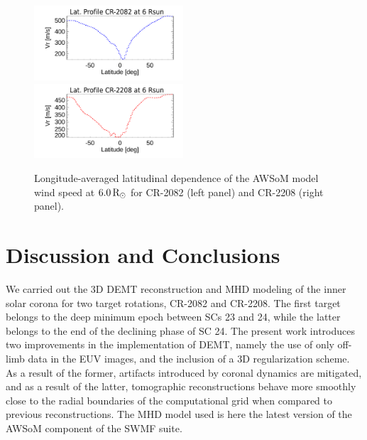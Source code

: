 \documentclass[namedreferences]{solarphysics}
\newcommand{\mrsun}{{\rm R_\odot}}
\def\notebyalbert#1{\textcolor{blue}{NOTE: #1}}
\begin{document}
\begin{article}
\begin{figure}[h!]
\begin{center}
\includegraphics[width=0.495\textwidth]{figs/Perfil_Vr_2082_5995_2.pdf}
\includegraphics[width=0.495\textwidth]{figs/Perfil_Vr_2208_5995_2.pdf}
\caption{{Longitude-averaged latitudinal dependence of the AWSoM model wind speed at $6.0\,\mrsun$ for CR-2082 (left panel) and CR-2208 (right panel).} %
}
\label{perf_lon_vr}
\end{center}
\end{figure}

\section{{Discussion and Conclusions}}\label{discu} 

{We carried out the 3D DEMT reconstruction and MHD modeling of the inner solar corona for two target rotations, CR-2082 and CR-2208. The first target belongs to the deep minimum epoch between SCs 23 and 24, while the latter belongs to the end of the declining phase of SC 24. The present work introduces two improvements in the implementation of DEMT, namely the use of only off-limb data in the EUV images, and the inclusion of a 3D regularization scheme. As a result of the former, artifacts introduced by coronal dynamics are mitigated, and as a result of the latter, tomographic reconstructions behave more smoothly close to the radial boundaries of the computational grid when compared to previous reconstructions. The MHD model used is here the latest version of the AWSoM component of the SWMF suite.}


\end{article}
\end{document}
